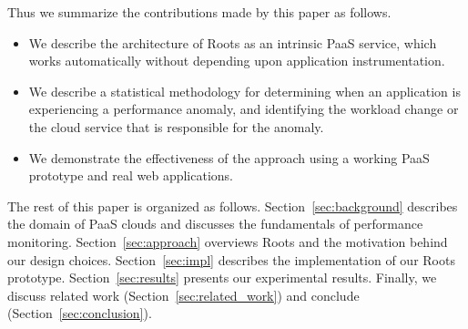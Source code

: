 Thus we summarize the contributions made by this paper as follows.
\begin{itemize}
\item We describe the architecture of Roots as an intrinsic PaaS
service, which works automatically without depending upon
application instrumentation.
\item We describe a statistical methodology for determining when an
application is experiencing a performance anomaly, and identifying the 
workload change or the cloud service that is responsible for the anomaly.
\item We demonstrate the effectiveness of the approach using a working PaaS
prototype and real web applications.
\end{itemize}

The rest of this paper is organized as follows.
Section~\ref{sec:background} describes the domain of 
PaaS clouds and discusses the fundamentals of performance monitoring. 
Section~\ref{sec:approach} overviews Roots and the
motivation behind our design choices.
Section~\ref{sec:impl} describes the implementation of our Roots prototype.
Section~\ref{sec:results} presents our
experimental results. Finally, we discuss related work (Section~\ref{sec:related_work}) and conclude (Section~\ref{sec:conclusion}). 

